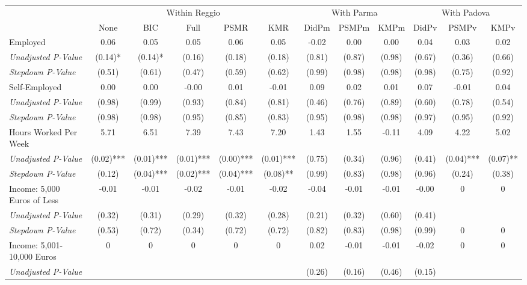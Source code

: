 \begin{tabular}{l c c c c c c c c c c c}
\toprule
& \multicolumn{5}{c}{Within Reggio} & \multicolumn{3}{c}{With Parma} & \multicolumn{3}{c}{With Padova} \\\cmidrule(lr){2-6} \cmidrule(lr){7-9} \cmidrule(lr){10-12}
 & None & BIC & Full & PSMR & KMR & DidPm & PSMPm & KMPm & DidPv & PSMPv & KMPv \\
\midrule
Employed & 0.06 & 0.05 & 0.05 & 0.06 & 0.05 & -0.02 & 0.00 & 0.00 & 0.04 & 0.03 & 0.02 \\
\quad \textit{Unadjusted P-Value} & (0.14)* & (0.14)* & (0.16) & (0.18) & (0.18) & (0.81) & (0.87) & (0.98) & (0.67) & (0.36) & (0.66) \\
\quad \textit{Stepdown P-Value} & (0.51) & (0.61) & (0.47) & (0.59) & (0.62) & (0.99) & (0.98) & (0.98) & (0.98) & (0.75) & (0.92) \\
Self-Employed & 0.00 & 0.00 & -0.00 & 0.01 & -0.01 & 0.09 & 0.02 & 0.01 & 0.07 & -0.01 & 0.04 \\
\quad \textit{Unadjusted P-Value} & (0.98) & (0.99) & (0.93) & (0.84) & (0.81) & (0.46) & (0.76) & (0.89) & (0.60) & (0.78) & (0.54) \\
\quad \textit{Stepdown P-Value} & (0.98) & (0.98) & (0.95) & (0.85) & (0.83) & (0.95) & (0.98) & (0.98) & (0.97) & (0.95) & (0.92) \\
Hours Worked Per Week & 5.71 & 6.51 & 7.39 & 7.43 & 7.20 & 1.43 & 1.55 & -0.11 & 4.09 & 4.22 & 5.02 \\
\quad \textit{Unadjusted P-Value} & (0.02)*** & (0.01)*** & (0.01)*** & (0.00)*** & (0.01)*** & (0.75) & (0.34) & (0.96) & (0.41) & (0.04)*** & (0.07)** \\
\quad \textit{Stepdown P-Value} & (0.12) & (0.04)*** & (0.02)*** & (0.04)*** & (0.08)** & (0.99) & (0.83) & (0.98) & (0.96) & (0.24) & (0.38) \\
Income: 5,000 Euros of Less & -0.01 & -0.01 & -0.02 & -0.01 & -0.02 & -0.04 & -0.01 & -0.01 & -0.00 & 0 & 0 \\
\quad \textit{Unadjusted P-Value} & (0.32) & (0.31) & (0.29) & (0.32) & (0.28) & (0.21) & (0.32) & (0.60) & (0.41) & & \\
\quad \textit{Stepdown P-Value} & (0.53) & (0.72) & (0.34) & (0.72) & (0.72) & (0.82) & (0.83) & (0.98) & (0.99) & 0 & 0 \\
Income: 5,001-10,000 Euros & 0 & 0 & 0 & 0 & 0 & 0.02 & -0.01 & -0.01 & -0.02 & 0 & 0 \\
\quad \textit{Unadjusted P-Value} & & & & & & (0.26) & (0.16) & (0.46) & (0.15) & & \\

\end{tabular}
